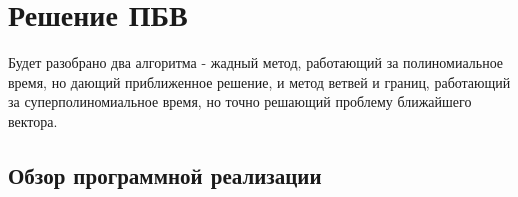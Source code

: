 \newpage

\section{Решение ПБВ}

Будет разобрано два алгоритма - жадный метод, работающий за полиномиальное время, но дающий приближенное решение, и метод ветвей и границ, работающий за суперполиномиальное время, но точно решающий проблему ближайшего вектора.


\subsection{Обзор программной реализации}

\clearpage